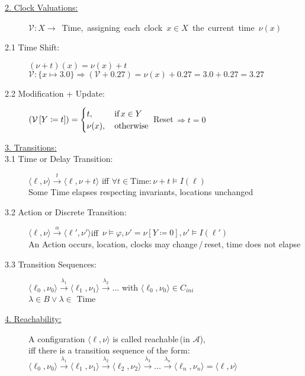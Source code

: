 \begin{tcolorbox}
\begin{description}
\item[\uline{2. Clock Valuations:}] \mbox{$\mathcal{V}: X \rightarrow$ Time, assigning each clock $x \in X$ the current time $\nu(x)$}
\item[2.1 Time Shift:] $(\nu + t)(x) = \nu(x) + t$\\
$\mathcal{V} : \{x \mapsto 3.0\} \Rightarrow (\mathcal{V} + 0.27) = \nu(x) + 0.27 = 3.0 + 0.27 = 3.27$
\item[2.2 Modification + Update:] $\left( \mathcal{V} \left[Y \coloneqq t \right] \right) = \begin{cases}
t, &\text{\,if\,} x \in Y\\
\nu(x), &\text{\,otherwise}
\end{cases}$
\vrule \hfill Reset\,$\Rightarrow t = 0$
\vspace{-0.2cm}
\item[\uline{3. Transitions:}]
\item[3.1 Time or Delay Transition:] $\langle \ell, \nu \rangle \xrightarrow{t} \langle \ell, \nu + t \rangle$ \hfill iff $\forall t \in \text{Time} : \nu + t \models I(\ell)$\\
Some Time elapses respecting invariants, locations unchanged
\item[3.2 Action or Discrete Transition:] \mbox{$\langle \ell, \nu \rangle \xrightarrow{\alpha} \langle \ell', \nu' \rangle$\hfill iff $\nu \models \varphi, \nu' = \nu \left[ Y \coloneqq 0 \right], \nu' \models I(\ell')$}\\
An Action occurs, location, clocks may change\,/\,reset, time does not elapse
\item[3.3 Transition Sequences:] $\langle \ell_0, \nu_0 \rangle \xrightarrow{\lambda_1} \langle \ell_1, \nu_1 \rangle \xrightarrow{\lambda_2} \ldots $ with $\langle \ell_0, \nu_0 \rangle \in C_{ini}$\\
$\lambda \in B \lor \lambda \in$ Time\\[-0.1cm]
\item[\uline{4. Reachability:}] A configuration $\langle \ell, \nu \rangle$ is called reachable\,(in $\mathcal{A}$),\\
iff there is a transition sequence of the form:\\
$\langle \ell_0, \nu_0 \rangle \xrightarrow{\lambda_1} \langle \ell_1, \nu_1 \rangle \xrightarrow{\lambda_2} \langle \ell_2, \nu_2 \rangle \xrightarrow{\lambda_3} \ldots \xrightarrow{\lambda_n} \langle \ell_n, \nu_n \rangle = \langle \ell, \nu \rangle$\\[-0.1cm]


\end{description}
\end{tcolorbox}
